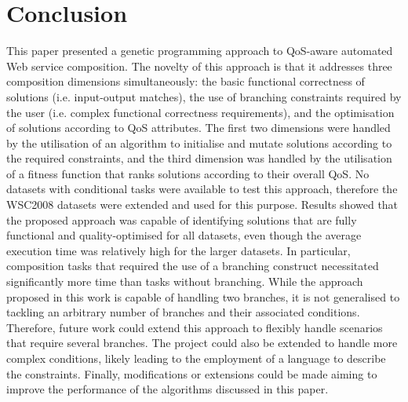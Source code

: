 \documentclass[conference]{IEEEtran}
\begin{document}
\section{Conclusion}\label{conclusion}
This paper presented a genetic programming approach to QoS-aware automated Web service composition. The novelty of this approach is that it addresses three composition dimensions simultaneously: the basic functional correctness of solutions (i.e. input-output matches), the use of branching constraints required by the user (i.e. complex functional correctness requirements), and the optimisation of solutions according to QoS attributes. The first two dimensions were handled by the utilisation of an algorithm to initialise and mutate solutions according to the required constraints, and the third dimension was handled by the utilisation of a fitness function that ranks solutions according to their overall QoS. No datasets with conditional tasks were available to test this approach, therefore the WSC2008 datasets were extended and used for this purpose. Results showed that the proposed approach was capable of identifying solutions that are fully functional and quality-optimised for all datasets, even though the average execution time was relatively high for the larger datasets. In particular, composition tasks that required the use of a branching construct necessitated significantly more time than tasks without branching.
While the approach proposed in this work is capable of handling two branches, it is not generalised to tackling an arbitrary number of branches and their associated conditions. Therefore, future work could extend this approach to flexibly handle scenarios that require several branches. The project could also be extended to handle more complex conditions, likely leading to the employment of a language to describe the constraints. Finally, modifications or extensions could be made aiming to improve the performance of the algorithms discussed in this paper.




\end{document}
